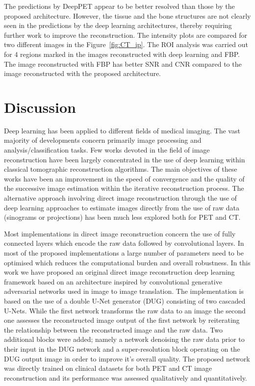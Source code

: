 The predictions by DeepPET appear to be better resolved than those by the proposed architecture. However, the tissue and the bone structures are not clearly seen in the predictions by the deep learning architectures, thereby requiring further work to improve the reconstruction. The intensity plots are compared for two different images in the Figure~\ref{fig:CT_ip}. The \ac{ROI} analysis was carried out for 4 regions marked in the images reconstructed with deep learning and \ac{FBP}. The image reconstructed with \ac{FBP} has better \ac{SNR} and \ac{CNR} compared to the image reconstructed with the proposed architecture.

\section{Discussion}
Deep learning has been applied to different fields of medical imaging. The vast majority of developments concern primarily image processing and analysis/classification tasks. Few works devoted in the field of image reconstruction have been largely concentrated in the use of deep learning within classical tomographic reconstruction algorithms. The main objectives of these works have been an improvement in the speed of convergence and the quality of the successive image estimation within the iterative reconstruction process. The alternative approach involving direct image reconstruction through the use of deep learning approaches to estimate images directly from the use of raw data (sinograms or projections) has been much less explored both for PET and CT. 

Most implementations in direct image reconstruction concern the use of fully connected layers which encode the raw data followed by convolutional layers. In most of the proposed implementations a large number of parameters need to be optimised which reduces the computational burden and overall robustness. In this work we have proposed an original direct image reconstruction deep learning framework based on an architecture inspired by convolutional generative adversarial networks used in image to image translation. The implementation is based on the use of a double U-Net generator (DUG) consisting of two cascaded U-Nets. While the first network transforms the raw data to an image the second one assesses the reconstructed image output of the first network by reiterating the relationship between the reconstructed image and the raw data. Two additional blocks were added; namely a network denoising the raw data prior to their input in the DUG network and a super-resolution block operating on the DUG output image in order to improve it's overall quality.  The proposed network was directly trained on clinical datasets for both PET and CT image reconstruction and its performance was assessed qualitatively and quantitatively. 

